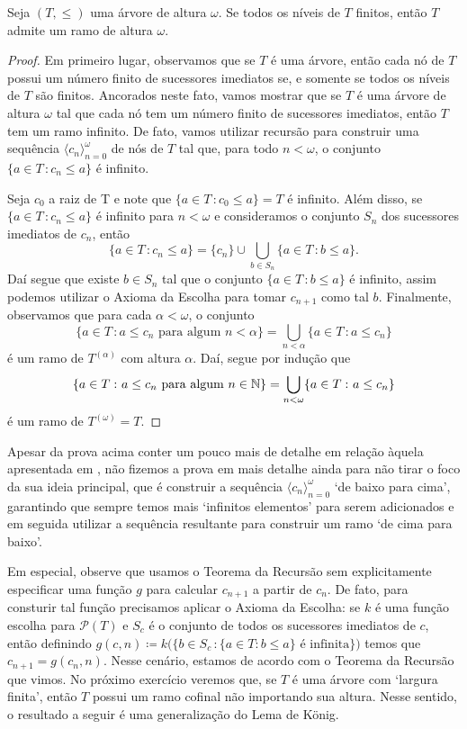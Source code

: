 \documentclass[a4paper]{article}
\begin{document}
  \begin{teo}
  Seja \((T,\leq)\) uma árvore de altura \(\omega\). Se todos os níveis de \(T\) finitos, então
  \(T\) admite um ramo de altura \(\omega\).
  \end{teo}
\begin{proof}
  Em primeiro lugar, observamos que se  \(T\) é uma árvore, então cada nó de \(T\) possui
  um número finito de sucessores imediatos se, e somente se todos os níveis de
  \(T\) são finitos. Ancorados neste fato, vamos mostrar que se \(T\) é uma
  árvore de altura \(\omega\) tal que cada nó tem um número finito de sucessores
  imediatos,  então \(T\) tem um ramo infinito. De fato, vamos utilizar recursão
  para  construir uma sequência \(\langle c_n\rangle_{n=0}^{\omega}\)  de nós de \(T\) tal que,
  para todo \(n<\omega\), o conjunto \(\{a\in T\,\colon c_n\leq a\}\) é
  infinito.

  Seja \(c_0\) a raiz de T e  note que \(\{a \in T\,\colon c_{0} \leq a \}= T\)
  é infinito. Além disso, se \(\{a\in T\,\colon c_n\leq a\}\) é infinito para
  \(n<\omega\) e consideramos  o
  conjunto \(S_n\) dos sucessores imediatos de \(c_n\), então
  \[
  \{a\in T\,\colon c_n\leq a\} = \{c_n\} \cup\bigcup_{b\in S_n} \{a\in T\,\colon b\leq a\}.
  \]
 Daí segue que existe \(b\in S_n\) tal que o conjunto \(\{a\in T\,\colon
 b\leq a\}\) é infinito, assim podemos utilizar o Axioma da Escolha para
 tomar \(c_{n+1}\) como tal \(b\). 
 Finalmente, observamos que para cada \(\alpha<\omega\), o conjunto
 \[\{a\in T\,\colon  a\leq c_n \text{ para algum }
   n<\alpha\}=\bigcup_{n<\alpha}\{a\in T\,\colon a\leq c_n\}\] é
  um ramo de \(T^{(\alpha)}\) com altura \(\alpha\). Daí,
  segue por indução que \[\{a\in T\,\colon a\leq c_n \text{ para algum }
    n\in\mathbb{N}\}=\bigcup_{n <\omega}\{a\in T\,\colon a\leq c_n\}\]
  é um ramo de \(T^{(\omega)}=T\).
  \end{proof}

    Apesar da prova acima conter um pouco mais de detalhe em relação àquela
    apresentada em \cite{jech}, não fizemos a prova em mais detalhe ainda para
    não tirar o foco da sua ideia principal, que é construir a sequência
    \(\langle c_n\rangle_{n=0}^\omega\)  `de baixo para cima', garantindo que
    sempre temos mais `infinitos elementos' para serem adicionados e em seguida
    utilizar a sequência resultante para construir um ramo `de cima para baixo'.

    Em especial, observe que usamos o Teorema da Recursão sem
    explicitamente especificar uma função \(g\) para
    calcular \(c_{n+1}\) a partir de \(c_n\). De fato, para consturir tal função precisamos
    aplicar o Axioma da Escolha: se \(k\) é uma função escolha para
    \(\mathcal{P}(T)\) e \(S_c\) é o conjunto de todos os sucessores imediatos
    de \(c\), então definindo \(g(c,n) \coloneqq k\big ( \{b\in S_c\,\colon
    \{a\in T: b\leq a\} \text{ é infinita}\}\big )\) temos que \(c_{n+1} =
    g(c_n, n)\). Nesse  cenário, estamos
    de acordo com o Teorema da Recursão que vimos. No próximo exercício veremos que,
    se \(T\) é uma árvore com `largura finita', então \(T\) possui um ramo
    cofinal não importando sua altura. Nesse sentido, o resultado a seguir é uma
    generalização do Lema de König.
  
\end{document}
